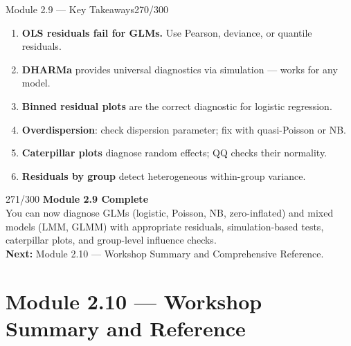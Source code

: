 \documentclass[10pt]{beamer}
\newcommand{\smark}[1]{\hfill{\scriptsize\color{codegray}#1}}
\begin{document}
\begin{frame}{Module 2.9 --- Key Takeaways}\smark{270/300}
\begin{enumerate}
    \item \textbf{OLS residuals fail for GLMs.} Use Pearson, deviance, or quantile residuals.
    \item \textbf{DHARMa} provides universal diagnostics via simulation --- works for any model.
    \item \textbf{Binned residual plots} are the correct diagnostic for logistic regression.
    \item \textbf{Overdispersion}: check dispersion parameter; fix with quasi-Poisson or NB.
    \item \textbf{Caterpillar plots} diagnose random effects; QQ checks their normality.
    \item \textbf{Residuals by group} detect heterogeneous within-group variance.
\end{enumerate}
\end{frame}

\begin{frame}{}\smark{271/300}
\centering\vspace{1.5cm}
{\Large\textbf{Module 2.9 Complete}}\\[0.5cm]
You can now diagnose GLMs (logistic, Poisson, NB, zero-inflated) and mixed models (LMM, GLMM) with appropriate residuals, simulation-based tests, caterpillar plots, and group-level influence checks.\\[0.5cm]
\textbf{Next:} Module 2.10 --- Workshop Summary and Comprehensive Reference.
\end{frame}

\section{Module 2.10 --- Workshop Summary and Reference}
\end{document}
